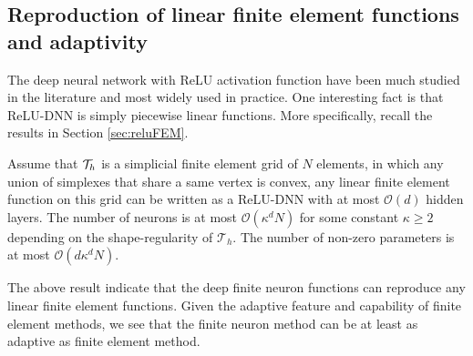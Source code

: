 \subsection{Reproduction of linear finite element functions and adaptivity}
The deep neural network with ReLU activation function have
been much studied in the literature and most widely used in practice.
One interesting fact is that ReLU-DNN is simply piecewise linear
functions.  More specifically, recall the results in Section \ref{sec:reluFEM}.

\begin{lemma}
Assume that ${\cal T}_h$ is a simplicial finite element grid of $N$ elements, in which any 
union of simplexes that share a same vertex is convex, any linear finite element function on this grid 
can be written as a ReLU-DNN with at most $\mathcal
  O(d)$ hidden layers. The number of neurons is at most
  $\mathcal{O}(\kappa^dN)$ for some constant $\kappa\ge 2$ depending
  on the shape-regularity of $\mathcal T_h$.  The number of non-zero
  parameters is at most $\mathcal{O} (d\kappa^dN)$.
\end{lemma}

The above result indicate that the deep finite neuron functions can
reproduce any linear finite element functions.  Given the adaptive
feature and capability of finite element methods, we see that the
finite neuron method can be at least as adaptive as finite element method.

